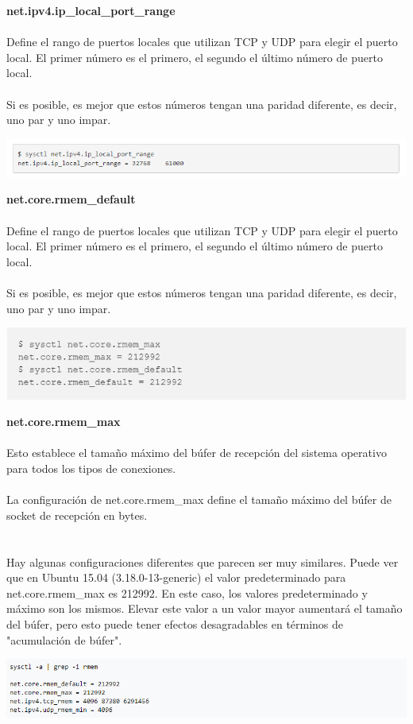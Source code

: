 {\bfseries  net.ipv4.ip\_local\_port\_range}
\\
\\Define el rango de puertos locales que utilizan TCP y UDP para elegir el puerto local. El primer número es el primero, el segundo el último número de puerto local. \\
\\Si es posible, es mejor que estos números tengan una paridad diferente, es decir, uno par y uno impar. 
\\
	\begin{center}
		\includegraphics[width=17cm]{./Imagenes/c} 
	\end{center} 

{\bfseries  net.core.rmem\_default}
\\
\\Define el rango de puertos locales que utilizan TCP y UDP para elegir el puerto local. El primer número es el primero, el segundo el último número de puerto local. \\
\\Si es posible, es mejor que estos números tengan una paridad diferente, es decir, uno par y uno impar. 
\\
	\begin{center}
		\includegraphics[width=17cm]{./Imagenes/t} 
	\end{center} 

{\bfseries  net.core.rmem\_max}
\\
\\Esto establece el tamaño máximo del búfer de recepción del sistema operativo para todos los tipos de conexiones.
\\
\\La configuración de net.core.rmem\_max define el tamaño máximo del búfer de socket de recepción en bytes.\\
\\
\\Hay algunas configuraciones diferentes que parecen ser muy similares. Puede ver que en Ubuntu 15.04 (3.18.0-13-generic) el valor predeterminado para net.core.rmem\_max es 212992. En este caso, los valores predeterminado y máximo son los mismos. Elevar este valor a un valor mayor aumentará el tamaño del búfer, pero esto puede tener efectos desagradables en términos de "acumulación de búfer". \\
	\begin{center}
		\includegraphics[width=17cm]{./Imagenes/s} 
	\end{center} 


